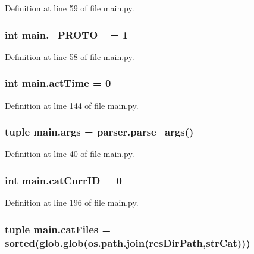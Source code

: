 Definition at line 59 of file main.\-py.

\hypertarget{a00122_afe92b072adc360963093d3660e7684ce}{
\subsubsection[{\-\_\-\-P\-R\-O\-T\-O\-\_\-}]{\setlength{\rightskip}{0pt plus 5cm}int main.\-\_\-\-P\-R\-O\-T\-O\-\_\- = 1}}\label{a00122_afe92b072adc360963093d3660e7684ce}


Definition at line 58 of file main.\-py.

\hypertarget{a00122_a9c2013c88f8354ccf6504c51843f1d5e}{
\subsubsection[{act\-Time}]{\setlength{\rightskip}{0pt plus 5cm}int main.\-act\-Time = 0}}\label{a00122_a9c2013c88f8354ccf6504c51843f1d5e}


Definition at line 144 of file main.\-py.

\hypertarget{a00122_a80760a53c8941c6f6f30e633649ffd8d}{
\subsubsection[{args}]{\setlength{\rightskip}{0pt plus 5cm}tuple main.\-args = parser.\-parse\-\_\-args()}}\label{a00122_a80760a53c8941c6f6f30e633649ffd8d}


Definition at line 40 of file main.\-py.

\hypertarget{a00122_aa56c55225fa65fa569bd8d5f1063550e}{
\subsubsection[{cat\-Curr\-I\-D}]{\setlength{\rightskip}{0pt plus 5cm}int main.\-cat\-Curr\-I\-D = 0}}\label{a00122_aa56c55225fa65fa569bd8d5f1063550e}


Definition at line 196 of file main.\-py.

\hypertarget{a00122_a189dc9cf606d870dacab059d5e7dca24}{
\subsubsection[{cat\-Files}]{\setlength{\rightskip}{0pt plus 5cm}tuple main.\-cat\-Files = sorted(glob.\-glob(os.\-path.\-join({\bf res\-Dir\-Path},{\bf str\-Cat})))}}\label{a00122_a189dc9cf606d870dacab059d5e7dca24}


